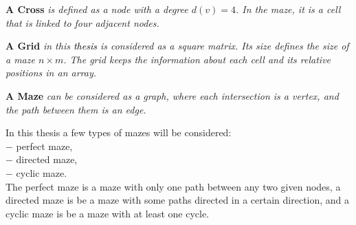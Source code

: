 \begin{definition}\textbf{A Cross} \emph{is defined as a node with a degree $d(v) = 4$. In the maze, it is a cell that is linked to four adjacent nodes. }\end{definition}
\begin{definition}\textbf{A Grid} \emph{in this \textcolor{black}{thesis} is considered as a square matrix. Its size defines the size of a maze $n \times m$. The grid keeps the information about each cell and its relative positions in an array.}\end{definition}
\begin{definition}\textbf{A Maze} \emph{can be considered as a graph, where each intersection is a vertex, and the path between them is an edge. }\end{definition}
\noindent In this thesis a few types of mazes will be considered:\\
$-$ perfect maze,\\
$-$ directed maze,\\
$-$ cyclic maze.\\
The perfect maze is a maze with only one path between any two given nodes, a directed maze is be a maze with some paths directed in a certain direction,
and a cyclic maze is be a maze with at least one cycle.\\ 
